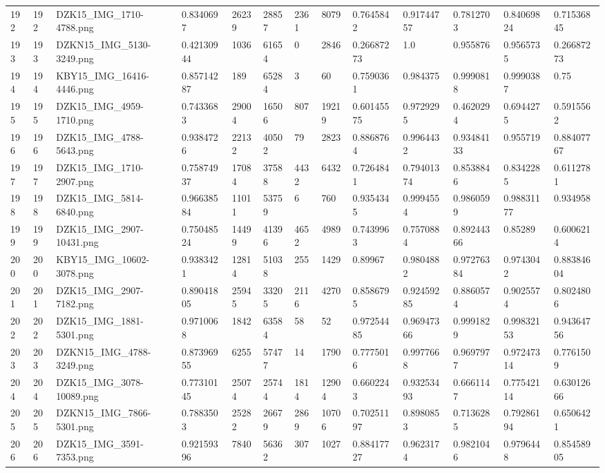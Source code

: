 \documentclass[11pt, a4paper, twoside]{report}
\begin{document}
\begin{longtable}[c]{@{}lllllllllllll@{}}
192 & 192 & DZK15\_IMG\_1710-4788.png & 0.8340697 & 26239 & 28857 & 2361 & 8079 & 0.7645842 & 0.91744757 & 0.7812703 & 0.84069824 & 0.71536845 \\
193 & 193 & DZKN15\_IMG\_5130-3249.png & 0.42130944 & 1036 & 61654 & 0 & 2846 & 0.26687273 & 1.0 & 0.955876 & 0.9565735 & 0.26687273 \\
194 & 194 & KBY15\_IMG\_16416-4446.png & 0.85714287 & 189 & 65284 & 3 & 60 & 0.7590361 & 0.984375 & 0.9990818 & 0.9990387 & 0.75 \\
195 & 195 & DZK15\_IMG\_4959-1710.png & 0.7433683 & 29004 & 16506 & 807 & 19219 & 0.60145575 & 0.9729295 & 0.4620294 & 0.6944275 & 0.5915562 \\
196 & 196 & DZK15\_IMG\_4788-5643.png & 0.9384726 & 22132 & 40502 & 79 & 2823 & 0.8868764 & 0.9964432 & 0.93484133 & 0.955719 & 0.88407767 \\
197 & 197 & DZK15\_IMG\_1710-2907.png & 0.75874937 & 17084 & 37588 & 4432 & 6432 & 0.7264841 & 0.79401374 & 0.8538846 & 0.8342285 & 0.6112781 \\
198 & 198 & DZK15\_IMG\_5814-6840.png & 0.96638584 & 11011 & 53759 & 6 & 760 & 0.9354345 & 0.9994554 & 0.9860599 & 0.98831177 & 0.934958 \\
199 & 199 & DZK15\_IMG\_2907-10431.png & 0.75048524 & 14499 & 41396 & 4652 & 4989 & 0.7439963 & 0.7570884 & 0.89244366 & 0.85289 & 0.6006214 \\
200 & 200 & KBY15\_IMG\_10602-3078.png & 0.9383421 & 12814 & 51038 & 255 & 1429 & 0.89967 & 0.9804882 & 0.97276384 & 0.9743042 & 0.88384604 \\
201 & 201 & DZK15\_IMG\_2907-7182.png & 0.89041805 & 25945 & 33205 & 2116 & 4270 & 0.8586795 & 0.92459285 & 0.8860574 & 0.9025574 & 0.8024806 \\
202 & 202 & DZK15\_IMG\_1881-5301.png & 0.9710068 & 1842 & 63584 & 58 & 52 & 0.97254485 & 0.96947366 & 0.9991829 & 0.99832153 & 0.94364756 \\
203 & 203 & DZKN15\_IMG\_4788-3249.png & 0.87396955 & 6255 & 57477 & 14 & 1790 & 0.7775016 & 0.9977668 & 0.9697977 & 0.97247314 & 0.7761509 \\
204 & 204 & DZK15\_IMG\_3078-10089.png & 0.77310145 & 25074 & 25744 & 1814 & 12904 & 0.6602243 & 0.93253493 & 0.6661147 & 0.77542114 & 0.63012666 \\
205 & 205 & DZKN15\_IMG\_7866-5301.png & 0.7883503 & 25282 & 26679 & 2869 & 10706 & 0.70251197 & 0.8980853 & 0.7136285 & 0.79286194 & 0.6506421 \\
206 & 206 & DZK15\_IMG\_3591-7353.png & 0.92159396 & 7840 & 56362 & 307 & 1027 & 0.88417727 & 0.9623174 & 0.9821046 & 0.9796448 & 0.85458905 \\

\end{longtable}
\end{document}
